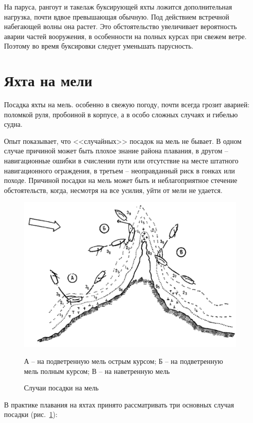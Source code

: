\documentclass[a4paper, 12pt, twoside, final]{scrbook}
\begin{document}
На паруса, рангоут и такелаж буксирующей яхты ложится дополнительная нагрузка, почти вдвое превышающая обычную. Под действием встречной набегающей волны она растет. Это обстоятельство увеличивает вероятность аварии частей вооружения, в особенности на полных курсах при свежем ветре. Поэтому во время буксировки следует уменьшать парусность.

\section{Яхта на мели}

Посадка яхты на мель. особенно в свежую погоду, почти всегда грозит аварией: поломкой руля, пробоиной в корпусе, а в особо сложных случаях и гибелью судна.

Опыт показывает, что <<случайных>> посадок на мель не бывает. В одном случае причиной может быть плохое знание района плавания, в другом \--- навигационные ошибки в счислении пути или отсутствие на месте штатного навигационного ограждения, в третьем \--- неоправданный риск в гонках или походе. Причиной посадки на мель может быть и неблагоприятное стечение обстоятельств, когда, несмотря на все усилия, уйти от мели не удается.

\begin{figure}[htbp]
   \centering
   \includegraphics{138_Posadka_na_mel} %
   \caption{Случаи посадки на мель}
   \label{fig:138}
   \centering\small
   А \--- на подветренную мель острым курсом; Б \--- на подветренную мель полным курсом; В \--- на наветренную мель
\end{figure}

В практике плавания на яхтах принято рассматривать три основных случая посадки (рис.~\ref{fig:138}):
\end{document}
